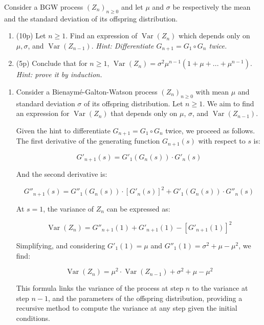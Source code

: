 \begin{problem}
	Consider a BGW process $(Z_n)_{n\geq 0}$ and let $\mu$ and $\sigma$ be respectively the mean and the standard deviation of its offspring distribution.
	\begin{enumerate}
		\item (10p) Let $n\geq 1$. Find an expression of $\operatorname{Var}(Z_n)$ which depends only on $\mu, \sigma$, and $\operatorname{Var}(Z_{n-1})$. \textit{Hint: Differentiate $G_{n+1} = G_1\circ G_n$ twice.}
		\item (5p) Conclude that for $n\geq 1$, $\operatorname{Var}(Z_n) = \sigma^2\mu^{n-1}(1+\mu +...+\mu^{n-1})$. \textit{Hint: prove it by induction.}
	\end{enumerate}
\end{problem}

\begin{solution}
	\begin{enumerate}
		\item 
		Consider a Bienaymé-Galton-Watson process $(Z_n)_{n\geq 0}$ with mean $\mu$ and standard deviation $\sigma$ of its offspring distribution. Let $n \geq 1$. We aim to find an expression for $\operatorname{Var}(Z_n)$ that depends only on $\mu$, $\sigma$, and $\operatorname{Var}(Z_{n-1})$.
		
		Given the hint to differentiate $G_{n+1} = G_1 \circ G_n$ twice, we proceed as follows. The first derivative of the generating function $G_{n+1}(s)$ with respect to $s$ is:
		
		\[
		G'_{n+1}(s) = G'_1(G_n(s)) \cdot G'_n(s)
		\]
		
		And the second derivative is:
		
		\[
		G''_{n+1}(s) = G''_1(G_n(s)) \cdot [G'_n(s)]^2 + G'_1(G_n(s)) \cdot G''_n(s)
		\]
		
		At $s=1$, the variance of $Z_n$ can be expressed as:
		
		\[
		\operatorname{Var}(Z_n) = G''_{n+1}(1) + G'_{n+1}(1) - [G'_{n+1}(1)]^2
		\]
		
		Simplifying, and considering $G'_1(1) = \mu$ and $G''_1(1) = \sigma^2 + \mu - \mu^2$, we find:
		
		\[
		\operatorname{Var}(Z_n) = \mu^2 \cdot \operatorname{Var}(Z_{n-1}) + \sigma^2 + \mu - \mu^2
		\]
		
		This formula links the variance of the process at step $n$ to the variance at step $n-1$, and the parameters of the offspring distribution, providing a recursive method to compute the variance at any step given the initial conditions.
		

\end{enumerate}
\end{solution}

